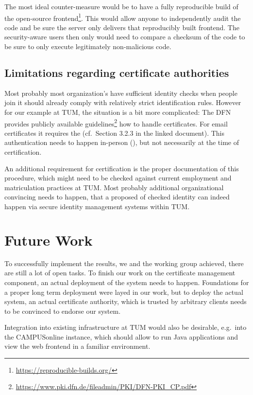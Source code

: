 The most ideal counter-measure would be to have a fully reproducible build of the open-source
frontend\footnote{\url{https://reproducible-builds.org/}}.
This would allow anyone to independently audit the code and be sure the server only delivers that reproducibly built
frontend.
The security-aware users then only would need to compare a checksum of the code to be sure to only execute legitimately
non-malicious code.

\subsection*{Limitations regarding certificate authorities}
Most probably most organization's have sufficient identity checks when people join it should already comply with
relatively strict identification rules.
However for our example at TUM, the situation is a bit more complicated:
The DFN provides publicly available guidelines\footnote{\url{https://www.pki.dfn.de/fileadmin/PKI/DFN-PKI_CP.pdf}} how
to handle certificates.
For email certificates it requires the  (cf.\ Section 3.2.3 in the linked
document).
This authentication needs to happen in-person (), but not necessarily at the time of
certification.

An additional requirement for certification is the proper documentation of this procedure, which might need to be
checked against current employment and matriculation practices at TUM\@.
Most probably additional organizational convincing needs to happen, that a proposed  of checked identity
can indeed happen via secure identity management systems within TUM\@.

\section*{Future Work}
To successfully implement the results, we and the working group  achieved, there are still a lot of
open tasks.
To finish our work on the certificate management component, an actual deployment of the system needs to happen.
Foundations for a proper long term deployment were layed in our work, but to deploy the actual system,
an actual certificate authority, which is trusted by arbitrary clients needs to be convinced to endorse our system.

Integration into existing infrastructure at TUM would also be desirable, e.g.\ into the CAMPUSonline instance, which
should allow to run Java applications and view the web frontend in a familiar environment.

